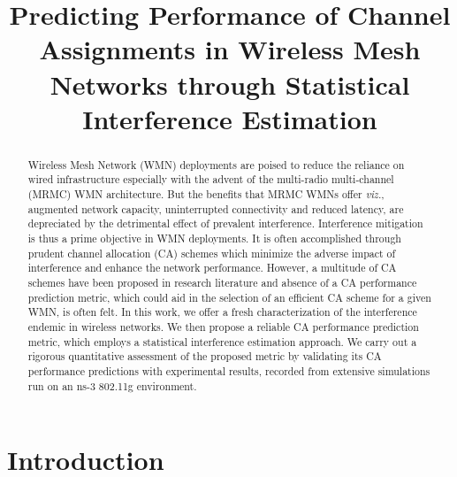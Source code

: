 \documentclass[conference]{IEEEtran}
\begin{document}



\title{Predicting Performance of Channel Assignments in Wireless Mesh Networks through Statistical Interference Estimation}


\author{
}

\maketitle

\begin{abstract}
Wireless Mesh Network (WMN) deployments are poised to reduce the reliance on wired infrastructure especially with the advent of the multi-radio multi-channel (MRMC) WMN  architecture. But the benefits that MRMC WMNs offer \emph{viz.}, augmented network capacity, uninterrupted connectivity and reduced latency, are depreciated by the detrimental effect of prevalent interference. Interference mitigation is thus a prime objective in WMN deployments. It is often accomplished through prudent channel allocation (CA) schemes which minimize the adverse impact of  interference and enhance the network performance. However, a multitude of CA schemes have been proposed in research literature and absence of a CA performance prediction metric, which could aid in the selection of an efficient CA scheme for a given WMN, is often felt. 
In this work, we offer a fresh characterization of the interference endemic in wireless networks. We then propose a reliable CA performance prediction metric, which employs a statistical interference estimation approach. We carry out a rigorous quantitative assessment of the proposed metric by validating its CA performance predictions with experimental results, recorded from extensive simulations run on an ns-3 802.11g environment.
\end{abstract}

\section{Introduction}
\end{document}
